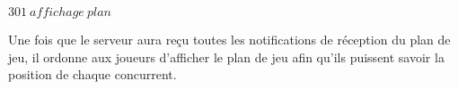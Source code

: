 \par

$ 301 ~ affichage ~ plan$

Une fois que le serveur aura reçu toutes les notifications de réception du plan de jeu, il ordonne aux joueurs d'afficher le plan de jeu afin qu'ils puissent savoir la position de chaque concurrent. \\